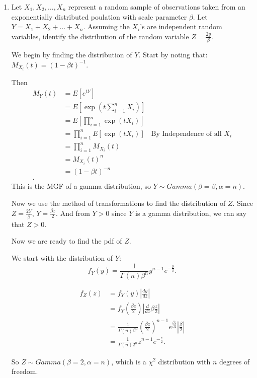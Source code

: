 \documentclass{article}
\begin{document}
\begin{enumerate}
\begin{enumerate}[label= (\alph*)]
\end{enumerate}
\item Let $X_1, X_2, \ldots, X_n$ represent a random sample of observations taken from an exponentially distributed poulation with scale parameter $\beta$. Let $Y=X_1+X_2+\ldots+X_n$. Assuming the $X_i$’s are independent random
variables, identify the distribution of the random variable $Z=\frac{2y}{\beta}$.

We begin by finding the distribution of $Y$. Start by noting that: $M_{X_i}(t)=(1-\beta t)^{-1}$.

Then 
\begin{align*}
    M_Y(t)&=E[e^{tY}]\\
          &= E[\exp\left( t \sum_{i=1}^{n} X_i \right) ] \\
          &= E[\prod_{i=1}^{n}  \exp\left(t X_i \right) ] \\
          &= \prod_{i=1}^{n} E[ \exp\left(t X_i \right) ] &\text{By Independence of all $X_i$}\\
          &= \prod_{i=1}^{n} M_{X_i}(t)\\
          &= M_{X_i}(t)^{n}\\
          &=(1-\beta t)^{-n}\\
.\end{align*}
This is the MGF of a gamma distribution, so $Y\sim Gamma(\beta=\beta,\alpha=n)$.

Now we use the method of transformations to find the distribution of $Z$. Since $Z=\frac{2Y}{\beta}$,
$Y=\frac{\beta z}{2}$. And from $Y>0$ since $Y$ is a gamma distribution, we can say that $Z>0$.

Now we are ready to find the pdf of $Z$.

We start with the distribution of $Y$:
\[
f_Y(y)=\frac{1}{\Gamma(n)\beta^{n}}y^{n-1}e^{-\frac{y}{\beta}}
.\] 

\begin{align*}
    f_Z(z)&= f_Y(y)\left| \frac{dy}{dz} \right|  \\
    &= f_Y\left(\frac{\beta z}{2}\right)\left| \frac{d}{dz} \beta \frac{z}{2} \right|  \\
    &= \frac{1}{\Gamma(n)\beta^{n}}\left(\frac{\beta z}{2}\right)^{n-1}
    e^{\frac{\beta z}{\beta 2}}\left|\frac{\beta}{2}\right| \\
    &= \frac{1}{\Gamma(n)2^{n}}z^{n-1}e^{-\frac{z}{2}}
.\end{align*}

So $Z\sim Gamma(\beta=2,\alpha=n)$, which is a $\chi^2$ distribution with $n$ degrees of freedom.


\end{enumerate}
\end{document}

